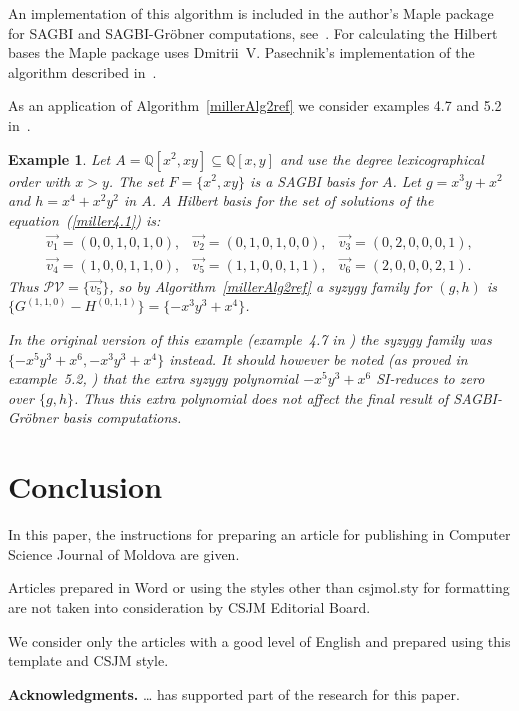\documentclass[11pt,a5paper,twoside]{article}
\newtheorem{example}{Example}
\begin{document}
An implementation of this algorithm is included in the author's
Maple package for SAGBI and SAGBI-Gr\"obner computations,
see~\cite{myMaplePackage}. For calculating the Hilbert bases the
Maple package uses Dmitrii~V. Pasechnik's implementation of the
algorithm described in~\cite{PasechnikHB}.

As an application of Algorithm~\ref{millerAlg2ref} we consider
examples 4.7 and 5.2 in~\cite{millerSG}.
\begin{example}
Let $A = \mathbb{Q}[x^2,xy] \subseteq \mathbb{Q}[x,y]$ and use the
degree lexicographical order with $x > y$. The set $F=\{x^2,xy\}$
is a SAGBI basis for $A$. Let $g = x^3 y + x^2$ and $h = x^4 + x^2
y^2$ in $A$. A Hilbert basis for the set of solutions of the
equation~(\ref{miller4.1}) is:
\[ \begin{array}{ccc}
\vec{v_1} = (0,0,1,0,1,0), & \vec{v_2} = (0,1,0,1,0,0), &
\vec{v_3} =
(0,2,0,0,0,1), \\
\vec{v_4} = (1,0,0,1,1,0), & \vec{v_5} = (1,1,0,0,1,1), &
\vec{v_6} = (2,0,0,0,2,1).
\end{array}\]
Thus $\mathcal{PV} =\{\vec{v_5}\}$, so by
Algorithm~\ref{millerAlg2ref} a syzygy family for $(g,h)$ is
$\{G^{(1,1,0)} - H^{(0,1,1)}\} =\{ -x^3 y^3 + x^4\}$.

In the original version of this example (example~4.7 in
\cite{millerSG}) the syzygy family was $\{-x^5 y^3 + x^6, -x^3 y^3
+ x^4 \}$ instead. It should however be noted (as proved in
example~5.2, \cite{millerSG}) that the extra syzygy polynomial
$-x^5 y^3 + x^6$ SI-reduces to zero over $\{g,h\}$. Thus this
extra polynomial does not affect the final result of
SAGBI-Gr\"obner basis computations.
\end{example}

\section{Conclusion}\label{sect5}
In this paper, the instructions for preparing an article for 
publishing in Computer Science Journal of Moldova are given.

Articles prepared in Word or using the styles other than csjmol.sty for formatting are not taken into consideration by CSJM Editorial Board.

We consider only the articles with a good level of English and prepared using this template and CSJM style. 

\textbf{Acknowledgments.} {\ldots} has supported part of the research for this paper.
\end{document}
